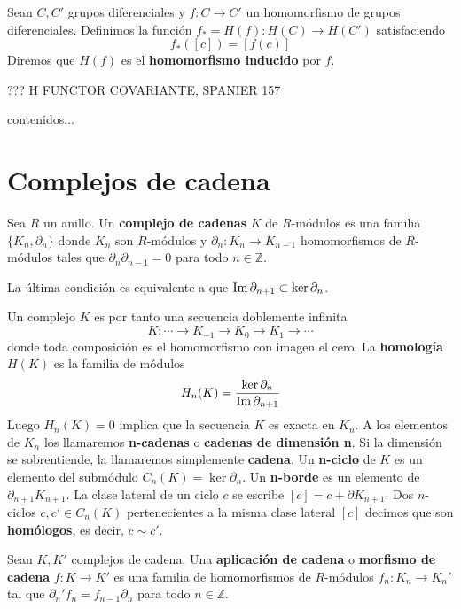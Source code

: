 \begin{definicion}
	Sean $C, C'$ grupos diferenciales y $f:C \rightarrow C'$ un homomorfismo de grupos diferenciales. Definimos la función $f_* = H(f): H(C) \rightarrow H(C')$ satisfaciendo 
	\[f_*([c]) = [f(c)] \]
	Diremos que $H(f)$ es el \textbf{homomorfismo inducido} por $f$.
\end{definicion}

??? H FUNCTOR COVARIANTE, SPANIER 157

\begin{ejemplo}
	contenidos...
\end{ejemplo}

\section{Complejos de cadena}

\begin{definicion}
	Sea $R$ un anillo. Un \textbf{complejo de cadenas} $K$ de $R$-módulos es una familia $\{K_n, \partial_n\}$ donde $K_n$ son $R$-módulos y $\partial_n : K_n \rightarrow K_{n-1}$ homomorfismos de $R$-módulos tales que $\partial_n \partial_{n-1} = 0$ para todo $n \in \mathbb{Z}$.
\end{definicion}

La última condición es equivalente a que $\operatorname{Im}{\partial_{n+1}} \subset \ker{\partial_n}$.

Un complejo $K$  es por tanto una secuencia doblemente infinita
\[ K : \cdots \rightarrow K_{-1} \rightarrow K_0 \rightarrow K_1 \rightarrow \cdots \]
donde toda composición es el homomorfismo con imagen el cero. La \textbf{homología} $H(K)$ es la familia de módulos
\[ H_n(K) = \frac{\ker \partial_n}{\operatorname{Im} \partial_{n+1}} \]
Luego $H_n(K)=0$ implica que la secuencia $K$ es exacta en $K_n$. A los elementos de $K_n$ los llamaremos \textbf{n-cadenas} o \textbf{cadenas de dimensión n}. Si la dimensión se sobrentiende, la llamaremos simplemente \textbf{cadena}. Un \textbf{n-ciclo} de $K$ es un elemento del submódulo $C_n(K) = \ker \partial_n$. Un \textbf{n-borde} es un elemento de $\partial_{n+1}K_{n+1}$. La clase lateral de un ciclo $c$ se escribe $[c] = c + \partial K_{n+1}$. Dos $n$-ciclos $c,c' \in C_n(K)$ pertenecientes a la misma clase lateral $[c]$ decimos que son \textbf{homólogos}, es decir, $c \sim c'$.

\begin{definicion}
	Sean $K,K'$ complejos de cadena. Una \textbf{aplicación de cadena} o \textbf{morfismo de cadena} $f: K \rightarrow K'$ es una familia de homomorfismos de $R$-módulos $f_n: K_n \rightarrow K_n'$ tal que $\partial_n'f_n = f_{n-1}\partial_n$ para todo $n \in \mathbb{Z}$.
\end{definicion}

